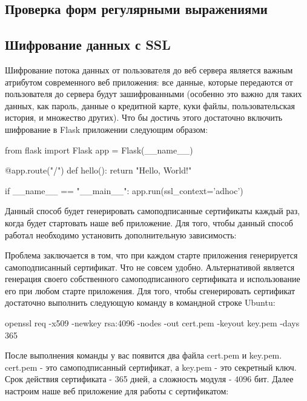 \subsection{Проверка форм регулярными выражениями}

\subsection{Шифрование данных с SSL}


Шифрование потока данных от пользователя до веб сервера является важным атрибутом
современного веб приложения: все данные, которые передаются от пользователя до сервера
будут зашифрованными (особенно это важно для таких данных, как пароль, данные о кредитной карте, куки файлы, 
пользовательская история, и множество других). Что бы достичь этого достаточно включить
шифрование в Flask приложении следующим образом:

\begin{python}
from flask import Flask
app = Flask(__name__)

@app.route("/")
def hello():
    return "Hello, World!"

if __name__ == "__main__":
    app.run(ssl_context='adhoc')
\end{python}

Данный способ будет генерировать самоподписанные сертификаты каждый раз, когда будет
стартовать наше веб приложение. Для того, чтобы данный способ работал необходимо установить
дополнительную зависимость:


Проблема заключается в том, что при каждом старте приложения генерируется самоподписанный 
сертификат. Что не совсем удобно. Альтернативой является генерация своего собственного 
самоподписанного сертификата и использование его при любом старте приложения. Для того,
чтобы сгенерировать сертификат достаточно выполнить следующую команду в командной строке
Ubuntu:

\begin{python}
openssl req -x509 -newkey rsa:4096 -nodes -out cert.pem -keyout key.pem -days 365
\end{python}

После выполнения команды у вас появится два файла cert.pem и key.pem. cert.pem - это
самоподписанный сертификат, а key.pem - это секретный ключ. Срок действия сертификата - 
365 дней, а сложность модуля - $4096$ бит. Далее настроим наше веб приложение для работы 
с сертификатом:

